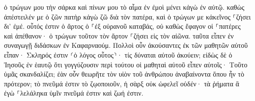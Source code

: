 \documentclass{openreader}
\begin{document}
ὁ τρώγων μου τὴν σάρκα καὶ πίνων μου τὸ αἷμα ἐν ἐμοὶ μένει κἀγὼ ἐν αὐτῷ. 
καθὼς ἀπέστειλέν με ὁ ζῶν πατὴρ κἀγὼ ζῶ διὰ τὸν πατέρα, καὶ ὁ τρώγων με κἀκεῖνος ⸀ζήσει δι’ ἐμέ. 
οὗτός ἐστιν ὁ ἄρτος ὁ ⸀ἐξ οὐρανοῦ καταβάς, οὐ καθὼς ἔφαγον οἱ ⸀πατέρες καὶ ἀπέθανον· ὁ τρώγων τοῦτον τὸν ἄρτον ⸀ζήσει εἰς τὸν αἰῶνα. 
ταῦτα εἶπεν ἐν συναγωγῇ διδάσκων ἐν Καφαρναούμ. 
Πολλοὶ οὖν ἀκούσαντες ἐκ τῶν μαθητῶν αὐτοῦ εἶπαν· Σκληρός ἐστιν ⸂ὁ λόγος οὗτος⸃· τίς δύναται αὐτοῦ ἀκούειν; 
εἰδὼς δὲ ὁ Ἰησοῦς ἐν ἑαυτῷ ὅτι γογγύζουσιν περὶ τούτου οἱ μαθηταὶ αὐτοῦ εἶπεν αὐτοῖς· Τοῦτο ὑμᾶς σκανδαλίζει; 
ἐὰν οὖν θεωρῆτε τὸν υἱὸν τοῦ ἀνθρώπου ἀναβαίνοντα ὅπου ἦν τὸ πρότερον; 
τὸ πνεῦμά ἐστιν τὸ ζῳοποιοῦν, ἡ σὰρξ οὐκ ὠφελεῖ οὐδέν· τὰ ῥήματα ἃ ἐγὼ ⸀λελάληκα ὑμῖν πνεῦμά ἐστιν καὶ ζωή ἐστιν. 
\end{document}
